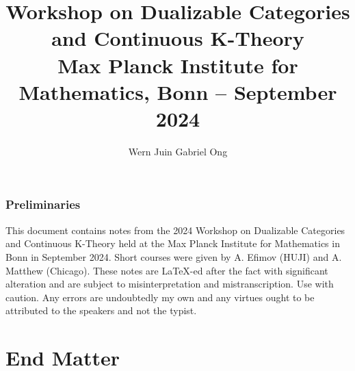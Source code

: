 \documentclass{amsart}
\theoremstyle{definition}
\numberwithin{equation}{section}
\begin{document}
\large
\title[Dualizable Categories and Continuous K-Theory -- MPIM 2024]{Workshop on Dualizable Categories and Continuous K-Theory \\ Max Planck Institute for Mathematics, Bonn -- September 2024}
\author{Wern Juin Gabriel Ong}
\address{Universit\"{a}t Bonn, Bonn, D-53111}
\maketitle
\section*{Preliminaries}
This document contains notes from the 2024 Workshop on Dualizable Categories and Continuous K-Theory held at the Max Planck Institute for Mathematics in Bonn in September 2024. Short courses were given by A. Efimov (HUJI) and A. Matthew (Chicago). These notes are \LaTeX-ed after the fact with significant alteration and are subject to misinterpretation and mistranscription. Use with caution. Any errors are undoubtedly my own and any virtues ought to be attributed to the speakers and not the typist. 
\tableofcontents
\newpage










%
\part*{End Matter}
\printbibliography
\end{document}
